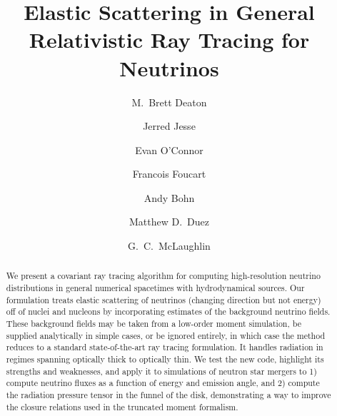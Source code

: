 \documentclass[aps,floatfix,prd,superscriptaddress,twocolumn]{revtex4-1}
\begin{document}
\widetext
{}

\title{Elastic Scattering in General Relativistic Ray Tracing for Neutrinos}

\author{M.\ Brett Deaton}

\author{Jerred Jesse}

\author{Evan O'Connor}

\author{Francois Foucart}

\author{Andy Bohn}

\author{Matthew D.\ Duez}

\author{G.\ C.\ McLaughlin}


\begin{abstract}
  We present a covariant ray tracing algorithm for computing high-resolution
  neutrino distributions in general numerical spacetimes with hydrodynamical
  sources.
  Our formulation treats elastic scattering of neutrinos (changing direction
  but not energy) off of nuclei and
  nucleons by incorporating estimates of the background neutrino fields.
  These background fields may be taken from a low-order moment simulation,
  be supplied analytically in simple cases,
  or be ignored entirely, in which case the method
  reduces to a standard state-of-the-art ray tracing formulation.
  It handles radiation in regimes spanning optically thick to optically thin.
  We test the new code, highlight its strengths and weaknesses, and
  apply it to simulations of neutron star mergers to
  1) compute neutrino fluxes as a function of energy and emission angle, and
  2) compute the radiation pressure tensor in the funnel of the disk,
  demonstrating a way to improve the closure relations used in the truncated
  moment formalism.
\end{abstract}
\end{document}
